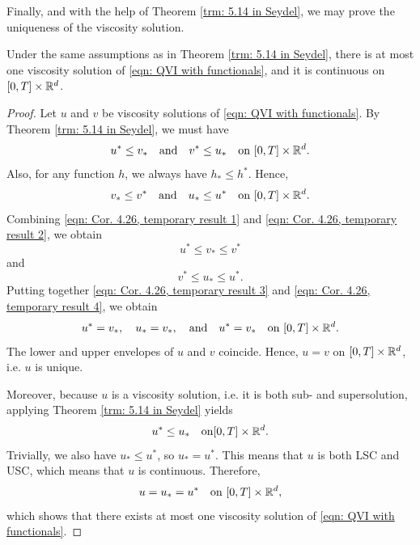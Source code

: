 Finally, and with the help of Theorem \ref{trm: 5.14 in Seydel}, we may prove the uniqueness of the viscosity solution.

\begin{corollary} 
\label{cor: Corollary 5.15 in Seydel}
    Under the same assumptions as in Theorem \ref{trm: 5.14 in Seydel}, there is at most one viscosity solution of \eqref{eqn: QVI with functionals}, and it is continuous on $[0,T] \times \mathbb{R}^d$. 
\end{corollary}
\begin{proof}
    Let $u$ and $v$ be viscosity solutions of \eqref{eqn: QVI with functionals}. By Theorem \ref{trm: 5.14 in Seydel}, we must have
    \begin{equation}
        u^* \leq v_* \quad \text{and} \quad v^* \leq u_* \quad \text{on } [0,T] \times \mathbb{R}^d. 
        \label{eqn: Cor. 4.26, temporary result 1}
    \end{equation}
    Also, for any function $h$, we always have $h_* \leq h^*$. Hence,
    \begin{equation}
        v_* \leq v^* \quad \text{and} \quad u_* \leq u^* \quad \text{on } [0,T] \times \mathbb{R}^d.
        \label{eqn: Cor. 4.26, temporary result 2}
    \end{equation}
    Combining \eqref{eqn: Cor. 4.26, temporary result 1} and \eqref{eqn: Cor. 4.26, temporary result 2}, we obtain
    \begin{equation}
        u^* \leq v_* \leq v^*
        \label{eqn: Cor. 4.26, temporary result 3}
    \end{equation}
    and 
    \begin{equation}
        v^* \leq u_* \leq u^*.
        \label{eqn: Cor. 4.26, temporary result 4}
    \end{equation}
    Putting together \eqref{eqn: Cor. 4.26, temporary result 3} and \eqref{eqn: Cor. 4.26, temporary result 4}, we obtain 
    \begin{equation*}
        u^* = v_*, \quad u_* = v_*, \quad \text{and} \quad u^* = v_* \quad \text{on } [0,T] \times \mathbb{R}^d. 
    \end{equation*}
    The lower and upper envelopes of $u$ and $v$ coincide. Hence, $u=v$ on $[0,T] \times \mathbb{R}^d$, i.e. $u$ is unique. 

    Moreover, because $u$ is a viscosity solution, i.e. it is both sub- and supersolution, applying Theorem \ref{trm: 5.14 in Seydel} yields
    \begin{equation*}
        u^* \leq u_* \quad \text{on} [0,T] \times \mathbb{R}^d.
    \end{equation*}
    Trivially, we also have $u_* \leq u^*$, so $u_* = u^*$. This means that $u$ is both LSC and USC, which means that $u$ is continuous. Therefore,
    \begin{equation*}
        u=u_*=u^* \quad \text{on } [0,T] \times \mathbb{R}^d,
    \end{equation*}
    which shows that there exists at most one viscosity solution of \eqref{eqn: QVI with functionals}.
\end{proof}

